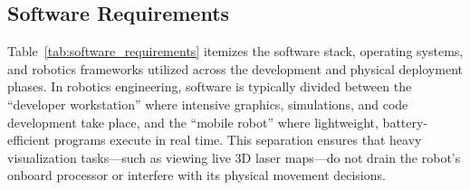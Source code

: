 \subsection{Software Requirements}
\label{sec:software_requirements}
Table~\ref{tab:software_requirements} itemizes the software stack, operating systems, and robotics frameworks utilized across the development and physical deployment phases. In robotics engineering, software is typically divided between the ``developer workstation'' where intensive graphics, simulations, and code development take place, and the ``mobile robot'' where lightweight, battery-efficient programs execute in real time. This separation ensures that heavy visualization tasks—such as viewing live 3D laser maps—do not drain the robot's onboard processor or interfere with its physical movement decisions.

